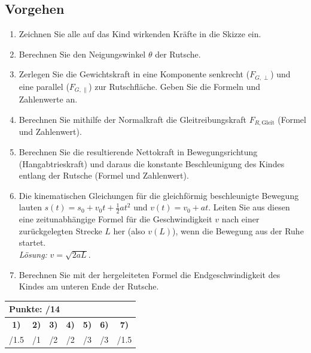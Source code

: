 \documentclass[11pt, a4paper]{article}
\begin{document}
\subsection*{Vorgehen}
\begin{enumerate}
    \item Zeichnen Sie alle auf das Kind wirkenden Kräfte in die Skizze ein.
    \item Berechnen Sie den Neigungswinkel $\theta$ der Rutsche.
    \item Zerlegen Sie die Gewichtskraft in eine Komponente senkrecht ($F_{G, \perp}$) und eine parallel ($F_{G, \parallel}$) zur Rutschfläche. Geben Sie die Formeln und Zahlenwerte an.
    \item Berechnen Sie mithilfe der Normalkraft die Gleitreibungskraft $F_{R, \text{Gleit}}$ (Formel und Zahlenwert).
    \item Berechnen Sie die resultierende Nettokraft in Bewegungsrichtung (Hangabtrieskraft) und daraus die konstante Beschleunigung des Kindes entlang der Rutsche (Formel und Zahlenwert).
    \item Die kinematischen Gleichungen für die gleichförmig beschleunigte Bewegung lauten $s(t) = s_0 + v_0 t + \frac{1}{2} a t^2$ und $v(t) = v_0 + at$. Leiten Sie aus diesen eine zeitunabhängige Formel für die Geschwindigkeit $v$ nach einer zurückgelegten Strecke $L$ her (also $v(L)$), wenn die Bewegung aus der Ruhe startet. \\
    \textit{Lösung: } $v = \sqrt{2aL}$.
    \item Berechnen Sie mit der hergeleiteten Formel die Endgeschwindigkeit des Kindes am unteren Ende der Rutsche.
 \end{enumerate}

\vfill
\begin{flushright}
\renewcommand{\arraystretch}{1.23}
\begin{tabular}{| c | c | c | c | c | c | c |}
\hline
\multicolumn{7}{|l|}{\textbf{\large{Punkte: \quad\quad\quad /14}}}\\
\hline
\textbf{1)} & \textbf{2)} & \textbf{3)} & \textbf{4)} & \textbf{5)} & \textbf{6)} & \textbf{7)} \\
\quad/1.5 & \quad/1 & \quad/2 & \quad/2 & \quad/3 & \quad/3 & \quad/1.5 \\
\hline
\end{tabular}
\end{flushright}

\newpage
\end{document}
